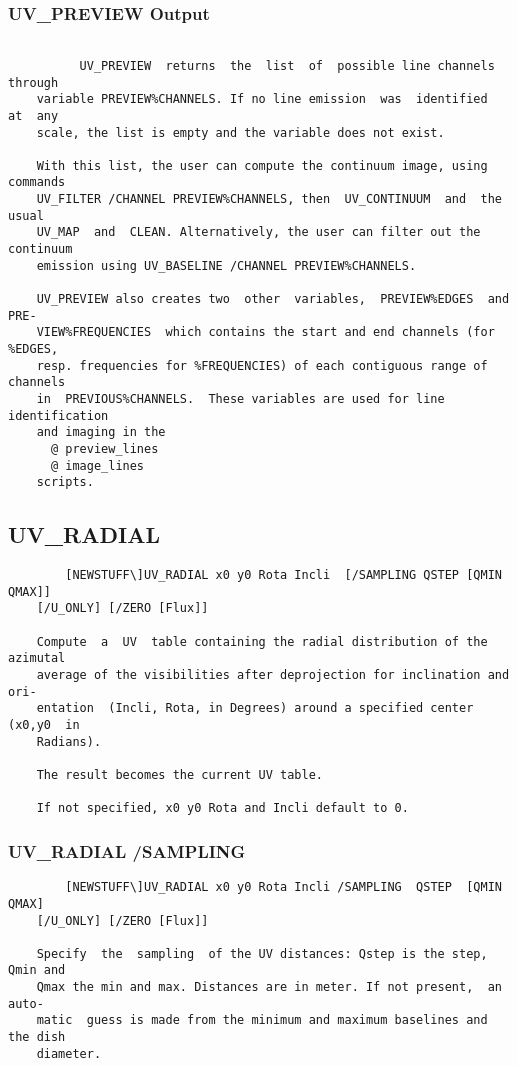 \subsubsection{UV\_PREVIEW Output}
\begin{verbatim}

          UV_PREVIEW  returns  the  list  of  possible line channels through
    variable PREVIEW%CHANNELS. If no line emission  was  identified  at  any
    scale, the list is empty and the variable does not exist.

    With this list, the user can compute the continuum image, using commands
    UV_FILTER /CHANNEL PREVIEW%CHANNELS, then  UV_CONTINUUM  and  the  usual
    UV_MAP  and  CLEAN. Alternatively, the user can filter out the continuum
    emission using UV_BASELINE /CHANNEL PREVIEW%CHANNELS.

    UV_PREVIEW also creates two  other  variables,  PREVIEW%EDGES  and  PRE-
    VIEW%FREQUENCIES  which contains the start and end channels (for %EDGES,
    resp. frequencies for %FREQUENCIES) of each contiguous range of channels
    in  PREVIOUS%CHANNELS.  These variables are used for line identification
    and imaging in the
      @ preview_lines
      @ image_lines
    scripts.

\end{verbatim}
\subsection{UV\_RADIAL}
\begin{verbatim}
        [NEWSTUFF\]UV_RADIAL x0 y0 Rota Incli  [/SAMPLING QSTEP [QMIN QMAX]]
    [/U_ONLY] [/ZERO [Flux]]

    Compute  a  UV  table containing the radial distribution of the azimutal
    average of the visibilities after deprojection for inclination and  ori-
    entation  (Incli, Rota, in Degrees) around a specified center (x0,y0  in
    Radians).

    The result becomes the current UV table.

    If not specified, x0 y0 Rota and Incli default to 0.

\end{verbatim}
\subsubsection{UV\_RADIAL /SAMPLING}
\begin{verbatim}
        [NEWSTUFF\]UV_RADIAL x0 y0 Rota Incli /SAMPLING  QSTEP  [QMIN  QMAX]
    [/U_ONLY] [/ZERO [Flux]]

    Specify  the  sampling  of the UV distances: Qstep is the step, Qmin and
    Qmax the min and max. Distances are in meter. If not present,  an  auto-
    matic  guess is made from the minimum and maximum baselines and the dish
    diameter.

\end{verbatim}
